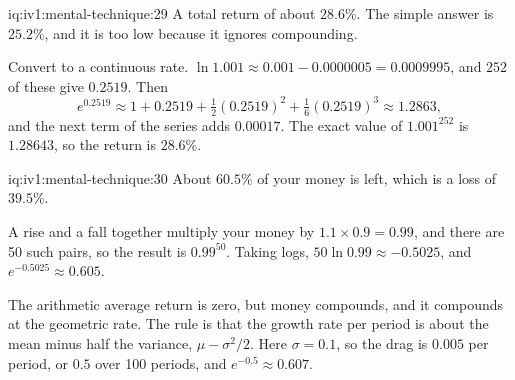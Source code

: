 \begin{solution}{iq:iv1:mental-technique:29}
A total return of about $28.6\%$. The simple answer is $25.2\%$, and it is too low because it ignores compounding.

Convert to a continuous rate. $\ln 1.001 \approx 0.001 - 0.0000005 = 0.0009995$, and $252$ of these give $0.2519$. Then
\[
e^{0.2519} \approx 1 + 0.2519 + \tfrac12 (0.2519)^2 + \tfrac16 (0.2519)^3 \approx 1.2863,
\]
and the next term of the series adds $0.00017$. The exact value of $1.001^{252}$ is $1.28643$, so the return is $28.6\%$.

\end{solution}

\begin{solution}{iq:iv1:mental-technique:30}
About $60.5\%$ of your money is left, which is a loss of $39.5\%$.

A rise and a fall together multiply your money by $1.1 \times 0.9 = 0.99$, and there are 50 such pairs, so the result is $0.99^{50}$. Taking logs, $50 \ln 0.99 \approx -0.5025$, and $e^{-0.5025} \approx 0.605$.

The arithmetic average return is zero, but money compounds, and it compounds at the geometric rate. The rule is that the growth rate per period is about the mean minus half the variance, $\mu - \sigma^2/2$. Here $\sigma = 0.1$, so the drag is $0.005$ per period, or $0.5$ over 100 periods, and $e^{-0.5} \approx 0.607$.

\end{solution}

